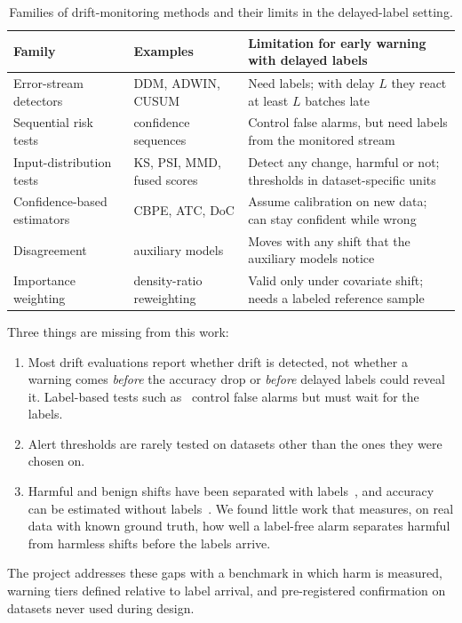 \begin{table}[H]
\caption{Families of drift-monitoring methods and their limits in the delayed-label setting.}
\label{tab:lit}
\centering
\small
\begin{tabularx}{\textwidth}{@{}p{3.4cm}p{3.2cm}X@{}}
\toprule
Family & Examples & Limitation for early warning with delayed labels \\
\midrule
Error-stream detectors & DDM, ADWIN, CUSUM & Need labels; with delay $L$ they react at least $L$ batches late \\
Sequential risk tests & confidence sequences~\cite{podkopaev2022tracking} & Control false alarms, but need labels from the monitored stream \\
Input-distribution tests & KS, PSI, MMD, fused scores & Detect any change, harmful or not; thresholds in dataset-specific units \\
Confidence-based estimators & CBPE, ATC, DoC & Assume calibration on new data; can stay confident while wrong \\
Disagreement & auxiliary models & Moves with any shift that the auxiliary models notice \\
Importance weighting & density-ratio reweighting & Valid only under covariate shift; needs a labeled reference sample \\
\bottomrule
\end{tabularx}
\end{table}

Three things are missing from this work:
\begin{enumerate}
\item Most drift evaluations report whether drift is detected, not whether a warning comes \emph{before} the accuracy drop or \emph{before} delayed labels could reveal it. Label-based tests such as~\cite{podkopaev2022tracking} control false alarms but must wait for the labels.
\item Alert thresholds are rarely tested on datasets other than the ones they were chosen on.
\item Harmful and benign shifts have been separated with labels~\cite{podkopaev2022tracking}, and accuracy can be estimated without labels~\cite{nannyml_cbpe,bialek2025pape}. We found little work that measures, on real data with known ground truth, how well a label-free alarm separates harmful from harmless shifts before the labels arrive.
\end{enumerate}
The project addresses these gaps with a benchmark in which harm is measured, warning tiers defined relative to label arrival, and pre-registered confirmation on datasets never used during design.
